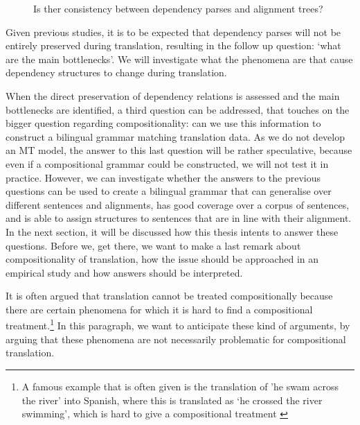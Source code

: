 \begin{figure}[!ht]

\centering

\caption{Is ther consistency between dependency parses and alignment trees?}\label{fig:depshats}
\end{figure}

Given previous studies, it is to be expected that dependency parses will not be entirely preserved during translation, resulting in the follow up question: `what are the main bottlenecks'. We will investigate what the phenomena are that cause dependency structures to change during translation.

When the direct preservation of dependency relations is assessed and the main bottlenecks are identified, a third question can be addressed, that touches on the bigger question regarding compositionality: can we use this information to construct a bilingual grammar matching translation data. As we do not develop an MT model, the answer to this last question will be rather speculative, because even if a compositional grammar could be constructed, we will not test it in practice. However, we can investigate whether the answers to the previous questions can be used to create a bilingual grammar that can generalise over different sentences and alignments, has good coverage over a corpus of sentences, and is able to assign structures to sentences that are in line with their alignment.\\

In the next section, it will be discussed how this thesis intents to answer these questions. Before we, get there, we want to make a last remark about compositionality of translation, how the issue should be approached in an empirical study and how answers should be interpreted.

It is often argued that translation cannot be treated compositionally because there are certain phenomena for which it is hard to find a compositional treatment.\footnote{A famous example that is often given is the translation of 'he swam across the river' into Spanish, where this is translated as `he crossed the river swimming', which is hard to give a compositional treatment \citep{landsbergen1989power}} In this paragraph, we want to anticipate these kind of arguments, by arguing that these phenomena are not necessarily problematic for compositional translation.

